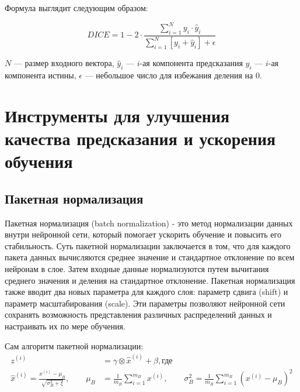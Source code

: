 Формула выглядит следующим образом:

\begin{equation}
	DICE = 1 - 2 \cdot \frac{\sum_{i=1}^{N} y_i \cdot \hat{y}_i}{\sum_{i=1}^{N} \left[y_i + \hat{y}_i \right] + \epsilon}
\end{equation}


\noindent $N$ --- размер входного вектора, $\hat{y}_i$ --- $i$-ая компонента
предсказания $y_i$ --- $i$-ая компонента истины, $\epsilon$ --- небольшое число
для избежания деления на 0.

\section{Инструменты для улучшения качества предсказания и ускорения обучения}

\subsection{Пакетная нормализация}

Пакетная нормализация (batch normalization) - это метод нормализации данных
внутри нейронной сети, который помогает ускорить обучение и повысить его
стабильность. Суть пакетной нормализации заключается в том, что для каждого
пакета данных вычисляются среднее значение и стандартное отклонение по всем
нейронам в слое. Затем входные данные нормализуются путем вычитания среднего
значения и деления на стандартное отклонение. Пакетная нормализация также
вводит два новых параметра для каждого слоя: параметр сдвига (shift) и параметр
масштабирования (scale). Эти параметры позволяют нейронной сети сохранять
возможность представления различных распределений данных и настраивать их по
мере обучения.

Сам алгоритм пакетной нормализации:
\begin{align*}
	z^{(i)} & = \gamma \otimes \hat x^{(i)} + \beta, \text{где}        \\
	\hat x^{(i)} = \frac{x^{(i)} - \mu_B}{\sqrt{\sigma^2_B + \xi}}, \qquad
	\mu_B   & = \frac{1}{m_B} \sum\limits_{i = 1}^{m_B}x^{(i)}, \qquad
	\sigma_B^2 = \frac{1}{m_B} \sum\limits_{i = 1}^{m_B}(x^{(i)} - \mu_B)^2
\end{align*}

